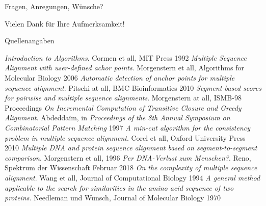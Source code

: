\documentclass[wide,xcolor={x11names},hyperref={colorlinks=false},pantone312]{beamer}
\begin{document}
\begin{frame}[c]{Fragen, Anregungen, Wünsche?}
	\begin{center}
		Vielen Dank für Ihre Aufmerksamkeit!
	\end{center}	
\end{frame}

\begin{frame}[t]{Quellenangaben}
	\tiny
	\begin{thebibliography}{10cm}
		 \emph{Introduction to Algorithms}. Cormen et all, MIT Press 1992
		 \emph{Multiple Sequence Alignment with user-defined achor points}. Morgenstern et all, Algorithms for Molecular Biology 2006
		 \emph{Automatic detection of anchor points for multiple sequence alignment}. Pitschi at all, BMC Bioinformatics 2010
		 \emph{Segment-based scores for pairwise and multiple sequence alignments}. Morgenstern at all, ISMB-98 Proceedings
		 \emph{On Incremental Computation of Transitive Closure and Greedy Alignment}. Abdedda\"{i}m, in \emph{Proceedings of the 8th Annual Symposium on Combinatorial Pattern Matching} 1997
		 \emph{A min-cut algorithm for the consistency problem in multiple sequence alignment}. Corel et all, Oxford University Press 2010
		 \emph{Multiple DNA and protein sequence alignment based on segment-to-segment comparison}. Morgenstern et all, 1996
		 \emph{Per DNA-Verlust zum Menschen?}. Reno, Spektrum der Wissenschaft Februar 2018
		 \emph{On the complexity of multiple sequence alignment}. Wang et all, Journal of Computational Biology 1994
		 \emph{A general method applicable to the search for similarities in the amino acid sequence of two proteins}. Needleman und Wunsch, Journal of Molecular Biology 1970
	\end{thebibliography}
	\normalsize
\end{frame}
\end{document}
